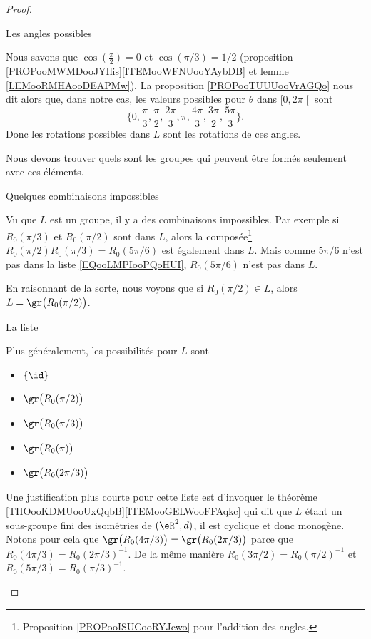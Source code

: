 \begin{proof}
\begin{subproof}
            \item[Les angles possibles]

                Nous savons que \( \cos(\frac{ \pi }{2})=0\) et \( \cos(\pi/3)=1/2\) (proposition \ref{PROPooMWMDooJYIlis}\ref{ITEMooWFNUooYAybDB} et lemme \ref{LEMooRMHAooDEAPMw}). La proposition \ref{PROPooTUUUooVrAGQo} nous dit alors que, dans notre cas, les valeurs possibles pour \( \theta\) dans \( \mathopen[ 0 , 2\pi \mathclose[\) sont
                    \begin{equation}        \label{EQooLMPIooPQoHUI}
                    \{ 0,\frac{ \pi }{ 3 },\frac{ \pi }{ 2 }, \frac{ 2\pi }{ 3 }, \pi,\frac{ 4\pi }{ 3 }, \frac{ 3\pi }{ 2 },\frac{ 5\pi }{ 3 } \}.
                \end{equation}
                Donc les rotations possibles dans \( L\) sont les rotations de ces angles.

                Nous devons trouver quels sont les groupes qui peuvent être formés seulement avec ces éléments.

            \item[Quelques combinaisons impossibles]

                Vu que \( L\) est un groupe, il y a des combinaisons impossibles. Par exemple si \( R_0(\pi/3)\) et \( R_0(\pi/2)\) sont dans \( L\), alors la composée\footnote{Proposition \ref{PROPooISUCooRYJcwo} pour l'addition des angles.} \( R_0(\pi/2)R_0(\pi/3)=R_0(5\pi/6)\) est également dans \( L\). Mais comme \( 5\pi/6\) n'est pas dans la liste \eqref{EQooLMPIooPQoHUI}, \( R_0(5\pi/6)\) n'est pas dans \( L\).
            
                En raisonnant de la sorte, nous voyons que si \( R_0(\pi/2)\in L\), alors \( L=\gr\big( R_0(\pi/2) \big)\).

            \item[La liste]

                Plus généralement, les possibilités pour \( L\) sont
                \begin{itemize}
                    \item \( \{ \id \}\)
                    \item \( \gr\big( R_0(\pi/2) \big)\)
                    \item \( \gr\big( R_0(\pi/3) \big)\)
                    \item \( \gr\big( R_0(\pi) \big)\)
                    \item \( \gr\big( R_0(2\pi/3) \big)\)
                \end{itemize}
                Une justification plus courte pour cette liste est d'invoquer le théorème \ref{THOooKDMUooUxQqbB}\ref{ITEMooGELWooFFAqkc} qui dit que \( L\) étant un sous-groupe fini des isométries de \( (\eR^2,d)\), il est cyclique et donc monogène. Notons pour cela que \( \gr\big( R_0(4\pi/3) \big)=\gr\big( R_0(2\pi/3) \big)\) parce que \( R_0(4\pi/3)=R_0(2\pi/3)^{-1}\). De la même manière \( R_0(3\pi/2)=R_0(\pi/2)^{-1}\) et \( R_0(5\pi/3)=R_0(\pi/3)^{-1}\).


\end{subproof}
\end{proof}
